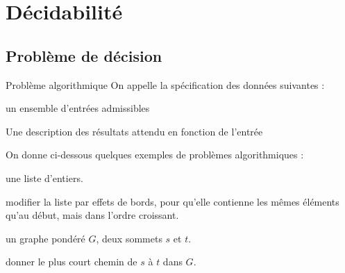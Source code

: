 \documentclass[a4paper,french,bookmarks]{book}
\begin{document}
    \section{Décidabilité}
    
    \subsection{Problème de décision}
    
    \begin{definition}{Problème algorithmique}
        On appelle  la spécification des données suivantes :
        \begin{enumerate}
            \itast un ensemble d'entrées admissibles 
            
            \itast Une description des résultats attendu en fonction de l'entrée
        \end{enumerate}
    \end{definition}
    
    On donne ci-dessous quelques exemples de problèmes algorithmiques :
    \begin{example}{}{}
        \begin{enumerate}
            \itt{} une liste d'entiers.
            
                 modifier la liste par effets de bords, pour qu'elle
                contienne les mêmes éléments qu'au début, mais dans l'ordre croissant.
                
            \itt{} un graphe pondéré $G$, deux sommets $s$ et $t$.
            
                 donner le plus court chemin de $s$ à $t$ dans $G$.
        \end{enumerate}
    \end{example}
    
\end{document}
